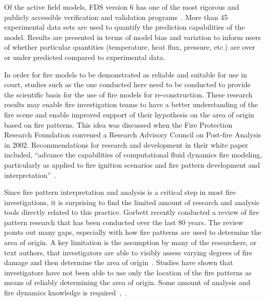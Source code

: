 \documentclass[twoside]{uocthesis}
\begin{document}
Of the active field models, FDS version 6 has one of the most rigorous and publicly accessible verification and validation programs~\cite{McGrattan:2014}. More than 45 experimental data sets are used to quantify the prediction capabilities of the model.  Results are presented in terms of model bias and variation to inform users of whether particular quantities (temperature, heat flux, pressure, etc.) are over or under predicted compared to experimental data.

In order for fire models to be demonstrated as reliable and suitable for use in court, studies such as the one conducted here need to be conducted to provide the scientific basis for the use of fire models for re-construction.  These research results may enable fire investigation teams to have a better understanding of the fire scene and enable improved support of their hypothesis on the area of origin based on fire patterns.  This idea was discussed when the Fire Protection Research Foundation convened a Research Advisory Council on Post-fire Analysis in 2002.  Recommendations for research and development in their white paper included, ``advance the capabilities of computational fluid dynamics fire modeling, particularly as applied to fire ignition scenarios and fire pattern development and interpretation''~\cite{RAC:2002}.

Since fire pattern interpretation and analysis is a critical step in most fire investigations, it is surprising to find the limited amount of research and analysis tools directly related to this practice.  Gorbett recently conducted a review of fire pattern research that has been conducted over the last 80 years. The review points out many gaps, especially with how fire patterns are used to determine the area of origin.  A key limitation is the assumption by many of the researchers, or text authors, that investigators are able to visibly assess varying degrees of fire damage and then determine the area of origin~\cite{Gorbett_2015}. Studies have shown that investigators have not been able to use only the location of the fire patterns as means of reliably determining the area of origin.  Some amount of analysis and fire dynamics knowledge is required~\cite{Carmen_2008},~\cite{Tinsley_2013}.      
\end{document}
